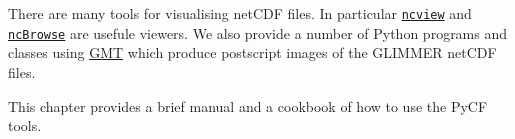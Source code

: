 There are many tools for visualising netCDF files. In particular \href{http://meteora.ucsd.edu/~pierce/ncview\_home\_page.html}{\texttt{ncview}} and \href{http://www.epic.noaa.gov/java/ncBrowse/}{\texttt{ncBrowse}} are usefule viewers. We also provide a number of Python programs and classes using \href{http://gmt.soest.hawaii.edu/}{GMT} which produce postscript images of the GLIMMER netCDF files.

This chapter provides a brief manual and a cookbook of how to use the PyCF tools. 




